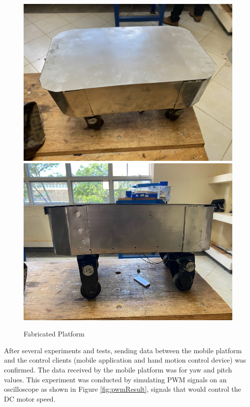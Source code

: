 \begin{figure}[H]
    \centering
    \includegraphics[scale = 0.08]{Figures/finalAssemblyCLOSED1.jpg}
    \includegraphics[scale = 0.4]{Figures/finalAssemblyCLOSED2.jpg}
    \caption{Fabricated Platform}
    \label{fig:fabassemblyplatform}
\end{figure}


After several experiments and tests, sending data between the mobile platform and the control clients (mobile application and hand motion control device) was confirmed. The data received by the mobile platform was for yaw and pitch values. This experiment was conducted by simulating \ac{PWM} signals on an oscilloscope as shown in Figure \ref{fig:pwmResult}, signals that would control the \ac{DC} motor speed.

